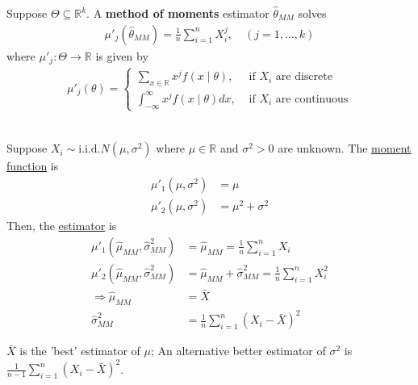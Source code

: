 \documentclass[11pt]{elegantbook}
\begin{document}
\begin{definition}
    \normalfont
    Suppose $\Theta\subseteq \mathbb{R}^k$. A \textbf{method of moments} estimator $\hat{\theta}_{MM}$ solves
    \begin{equation}
        \begin{aligned}
            \mu'_j(\hat{\theta}_{MM})=\frac{1}{n}\sum_{i=1}^n X_i^j,\quad (j=1,...,k)
        \end{aligned}
        \nonumber
    \end{equation}
    where $\mu'_j: \Theta \rightarrow \mathbb{R}$ is given by
    \begin{equation}
        \begin{aligned}
            \mu'_j(\theta)=\left\{\begin{matrix}
                \sum_{x\in \mathbb{R}}x^j f(x\mid \theta),& \text{ if $X_i$ are discrete}\\
                \int_{-\infty}^\infty x^j f(x\mid \theta) dx,& \text{ if $X_i$ are continuous}
            \end{matrix}\right.
        \end{aligned}
        \nonumber
    \end{equation}
\end{definition}
\begin{example}\quad\\
    Suppose $X_i\sim \text{i.i.d.}N(\mu,\sigma^2)$ where $\mu\in \mathbb{R}$ and $\sigma^2>0$ are unknown. The \underline{moment function} is
    \begin{equation}
        \begin{aligned}
            \mu'_1(\mu,\sigma^2)&=\mu\\
            \mu'_2(\mu,\sigma^2)&=\mu^2+\sigma^2
        \end{aligned}
        \nonumber
    \end{equation}
    Then, the \underline{estimator} is
    \begin{equation}
        \begin{aligned}
            \mu'_1(\hat{\mu}_{MM},\hat{\sigma}^2_{MM})&=\hat{\mu}_{MM}=\frac{1}{n}\sum_{i=1}^n X_i\\
            \mu'_2(\hat{\mu}_{MM},\hat{\sigma}^2_{MM})&=\hat{\mu}_{MM}+\hat{\sigma}^2_{MM}=\frac{1}{n}\sum_{i=1}^n X_i^2\\
            \Rightarrow \hat{\mu}_{MM}&=\bar{X}\\
            \hat{\sigma}^2_{MM}&=\frac{1}{n}\sum_{i=1}^n (X_i-\bar{X})^2
        \end{aligned}
        \nonumber
    \end{equation}
    \begin{remark}
        $\bar{X}$ is the 'best' estimator of $\mu$; An alternative better estimator of $\sigma^2$ is $\frac{1}{n-1}\sum_{i=1}^n (X_i-\bar{X})^2$.
    \end{remark}
\end{example}
\end{document}
